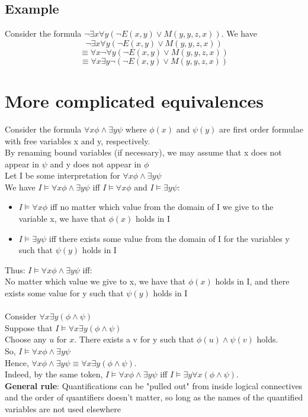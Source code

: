 \documentclass{article}[18pt]
\begin{document}
\subsection{Example}
Consider the formula $\neg \exists x \forall y ( \neg E ( x , y ) \vee M ( y , y , z , x ) )$. We have
$$\neg \exists x \forall y ( \neg E ( x , y ) \vee M ( y , y , z , x ) )$$
$$\equiv \forall x \neg \forall y ( \neg E ( x , y ) \vee M ( y , y , z , x ) )$$
$$\equiv \forall x \exists y \neg ( \neg E ( x , y ) \vee M ( y , y , z , x ) )$$
\section{More complicated equivalences}
Consider the formula $\forall x \phi \land \exists y \psi$ where $\phi(x)$ and $\psi (y)$ are first order formulae with free variables x and y, respectively.\\
By renaming bound variables (if necessary), we may assume that x does not appear in $\psi$ and y does not appear in $\phi$\\
Let I be some interpretation for $\forall x \phi \land \exists y \psi$\\
We have $I\models \forall x \phi\land \exists y\psi$ iff $I\models \forall x \phi$ and $I\models \exists y\psi$:
\begin{itemize}
	\item $I\models \forall x \phi$ iff no matter which value from the domain of I we give to the variable x, we have that $\phi(x)$ holds in I
	\item $I\models \exists y\psi$ iff there exists some value from the domain of I for the variables y such that $\psi(y)$ holds in I
\end{itemize} 
Thus: $I\models \forall x \phi \land \exists y \psi$ iff:\\
No matter which value we give to x, we have that $\phi(x)$ holds in I, and there exists some value for y such that $\psi (y)$ holds in I\\
\\
Consider $\forall x \exists y(\phi \land \psi)$\\
Suppose that $I\models \forall x \exists y (\phi \land \psi)$\\
Choose any $u$ for $x$. There exists a v for y such that $\phi(u)\land \psi(v)$ holds.\\
So, $I\models \forall x \phi \land \exists y \psi$\\
Hence, $\forall x \phi \land \exists y \psi\equiv \forall x \exists y (\phi \land \psi)$.\\
Indeed, by the same token, $I\models \forall x \phi \land \exists y \psi$ iff $I\models \exists y\forall x (\phi \land \psi)$.\\
\textbf{General rule}: Quantifications can be "pulled out" from inside logical connectives and the order of quantifiers doesn't matter, so long as the names of the quantified variables are not used elsewhere
\end{document}
